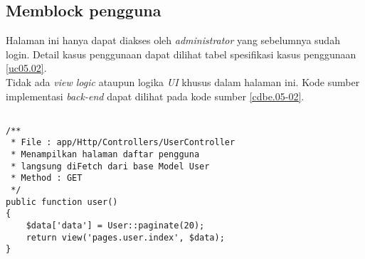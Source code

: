 \subsection{Memblock pengguna}
Halaman ini hanya dapat diakses oleh \textit{administrator} yang sebelumnya sudah login. Detail kasus penggunaan dapat dilihat tabel spesifikasi kasus penggunaan \ref{uc05.02}.\\
\indent Tidak ada \textit{view logic} ataupun logika \textit{UI} khusus dalam halaman ini. Kode sumber implementasi \textit{back-end} dapat dilihat pada kode sumber \ref{cdbe.05-02}.

\begin{lstlisting}[label=cdbe.05-02,style=php,caption=Kode Sumber Antarmuka Registrasi]

/** 
 * File : app/Http/Controllers/UserController
 * Menampilkan halaman daftar pengguna
 * langsung diFetch dari base Model User
 * Method : GET
 */
public function user()
{
    $data['data'] = User::paginate(20);
    return view('pages.user.index', $data);
}
\end{lstlisting}
      
